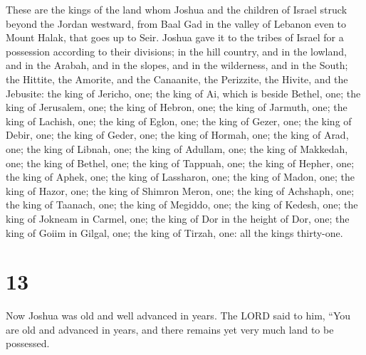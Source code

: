  These are the kings of the land whom Joshua and the
children of Israel struck beyond the Jordan westward, from Baal Gad in
the valley of Lebanon even to Mount Halak, that goes up to Seir. Joshua
gave it to the tribes of Israel for a possession according to their
divisions;  in the hill country, and in the lowland, and
in the Arabah, and in the slopes, and in the wilderness, and in the
South; the Hittite, the Amorite, and the Canaanite, the Perizzite, the
Hivite, and the Jebusite:  the king of Jericho, one; the
king of Ai, which is beside Bethel, one;  the king of
Jerusalem, one; the king of Hebron, one;  the king of
Jarmuth, one; the king of Lachish, one;  the king of
Eglon, one; the king of Gezer, one;  the king of Debir,
one; the king of Geder, one;  the king of Hormah, one;
the king of Arad, one;  the king of Libnah, one; the king
of Adullam, one;  the king of Makkedah, one; the king of
Bethel, one;  the king of Tappuah, one; the king of
Hepher, one;  the king of Aphek, one; the king of
Lassharon, one;  the king of Madon, one; the king of
Hazor, one;  the king of Shimron Meron, one; the king of
Achshaph, one;  the king of Taanach, one; the king of
Megiddo, one;  the king of Kedesh, one; the king of
Jokneam in Carmel, one;  the king of Dor in the height of
Dor, one; the king of Goiim in Gilgal, one;  the king of
Tirzah, one: all the kings thirty-one.

\hypertarget{section-12}{%
\section{13}\label{section-12}}

 Now Joshua was old and well advanced in years. The LORD
said to him, ``You are old and advanced in years, and there remains yet
very much land to be possessed.

